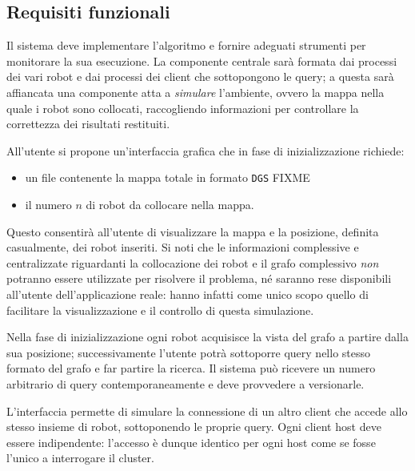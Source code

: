 \subsection{Requisiti funzionali}
\label{sec:func-req}
Il sistema deve implementare l'algoritmo e fornire adeguati strumenti
per monitorare la sua esecuzione.
La componente centrale sarà formata dai processi dei vari robot e dai
processi dei client che sottopongono le query; a questa
sarà affiancata una componente atta a \emph{simulare}
l'ambiente, ovvero la mappa nella quale i robot sono collocati,
raccogliendo informazioni per controllare la correttezza dei risultati
restituiti.

All'utente si propone un'interfaccia grafica che in
fase di inizializzazione richiede:
\begin{itemize}
\item un file contenente la mappa totale in formato \texttt{DGS} FIXME
\item il numero $n$ di robot da collocare nella mappa.
\end{itemize}
Questo consentirà all'utente di visualizzare la mappa e la posizione,
definita casualmente, dei robot inseriti. Si noti che le
informazioni complessive e centralizzate riguardanti la collocazione
dei robot e il grafo complessivo \emph{non} potranno essere
utilizzate per risolvere il problema, né saranno rese disponibili
all'utente dell'applicazione reale: hanno infatti come unico scopo
quello di facilitare la visualizzazione e il controllo di
questa simulazione.

Nella fase di inizializzazione ogni robot acquisisce la vista del
grafo a partire dalla sua posizione;
successivamente l'utente potrà sottoporre query nello stesso formato
del grafo e far partire la ricerca.
Il sistema può ricevere un numero arbitrario di query
contemporaneamente e deve provvedere a versionarle.

L'interfaccia permette di simulare la connessione di un altro
client che accede allo stesso insieme di robot, sottoponendo
le proprie query. Ogni client host deve essere indipendente:
l'accesso è dunque identico per ogni host come se fosse l'unico a
interrogare il cluster.


